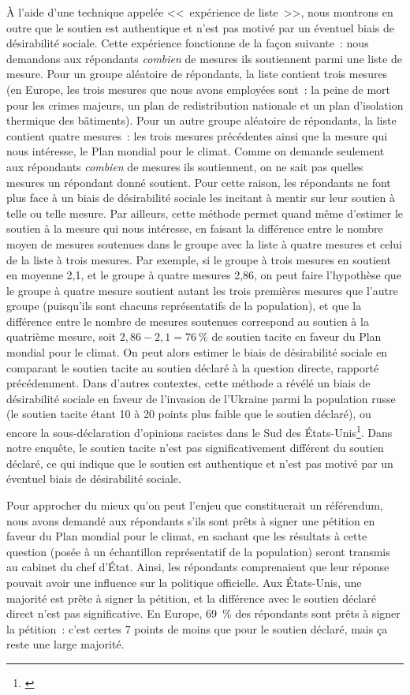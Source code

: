 \documentclass[a5paper,french]{memoir}
\begin{document}
À l'aide d'une technique appelée <<~expérience de liste~>>, nous montrons en outre que le soutien est authentique et n'est pas motivé par un éventuel biais de désirabilité sociale. Cette expérience fonctionne de la façon suivante~: nous demandons aux répondants \textit{combien} de mesures ils soutiennent parmi une liste de mesure. Pour un groupe aléatoire de répondants, la liste contient trois mesures (en Europe, les trois mesures que nous avons employées sont~: la peine de mort pour les crimes majeurs, un plan de redistribution nationale et un plan d'isolation thermique des bâtiments). Pour un autre groupe aléatoire de répondants, la liste contient quatre mesures~: les trois mesures précédentes ainsi que la mesure qui nous intéresse, le Plan mondial pour le climat. Comme on demande seulement aux répondants \textit{combien} de mesures ils soutiennent, on ne sait pas quelles mesures un répondant donné soutient. Pour cette raison, les répondants ne font plus face à un biais de désirabilité sociale les incitant à mentir sur leur soutien à telle ou telle mesure. Par ailleurs, cette méthode permet quand même d'estimer le soutien à la mesure qui nous intéresse, en faisant la différence entre le nombre moyen de mesures soutenues dans le groupe avec la liste à quatre mesures et celui de la liste à trois mesures. Par exemple, si le groupe à trois mesures en soutient en moyenne 2,1, et le groupe à quatre mesures 2,86, on peut faire l'hypothèse que le groupe à quatre mesure soutient autant les trois premières mesures que l'autre groupe (puisqu'ils sont chacuns représentatifs de la population), et que la différence entre le nombre de mesures soutenues correspond au soutien à la quatrième mesure, soit $2,86 - 2,1 = 76~\%$ de soutien tacite en faveur du Plan mondial pour le climat. On peut alors estimer le biais de désirabilité sociale en comparant le soutien tacite au soutien déclaré à la question directe, rapporté précédemment. Dans d'autres contextes, cette méthode a révélé un biais de désirabilité sociale en faveur de l'invasion de l'Ukraine parmi la population russe (le soutien tacite étant 10 à 20 points plus faible que le soutien déclaré), ou encore la sous-déclaration d'opinions racistes dans le Sud des États-Unis\footnote{\citet{kuklinski_racial_1997,chapkovski_solid_2022}}. Dans notre enquête, le soutien tacite n'est pas significativement différent du soutien déclaré, ce qui indique que le soutien est authentique et n'est pas motivé par un éventuel biais de désirabilité sociale. 

Pour approcher du mieux qu'on peut l'enjeu que constituerait un référendum, nous avons demandé aux répondants s'ils sont prêts à signer une pétition en faveur du Plan mondial pour le climat, en sachant que les résultats à cette question (posée à un échantillon représentatif de la population) seront transmis au cabinet du chef d'État. Ainsi, les répondants comprenaient que leur réponse pouvait avoir une influence sur la politique officielle. Aux États-Unis, une majorité est prête à signer la pétition, et la différence avec le soutien déclaré direct n'est pas significative. En Europe, 69~\% des répondants sont prêts à signer la pétition~: c'est certes 7 points de moins que pour le soutien déclaré, mais ça reste une large majorité. 
\end{document}

